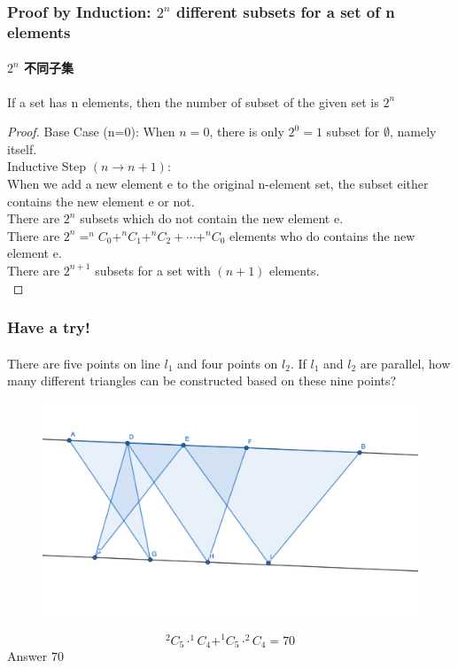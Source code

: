 \documentclass[
	11pt, %
]{beamer}
\begin{document}
\begin{frame}
	\frametitle{Proof by Induction: $2^n$ different subsets for a set of n elements }
	\framesubtitle{$2^n$ 不同子集}
		\begin{theorem}
		If a set has n elements, then the number of subset of the given set is $2^n$
	\end{theorem}

	\begin{proof}
		Base Case (n=0): When $n=0$, there is only $2^0 =1$ subset for $\emptyset$, namely itself.\\
		Inductive Step $(n \rightarrow n + 1)$: \\
		When we add a new element e to the original n-element set, the subset either contains the new element e or not.\\
		There are $2^n$ subsets which do not contain the new element  e.\\
		There are $2^n = ^nC_0+ ^nC_1 + ^nC_2 + \cdots + ^nC_0$ elements who do contains the new element e.\\
		There are $2^{n+1}$ subsets for a set with $(n + 1)$ elements.\\
	\end{proof}
\end{frame}



\begin{frame}
	\frametitle{Have a try!}
	\framesubtitle{}
There are five points on line $l_1$ and four points on $l_2$. If $l_1$ and $l_2$ are parallel, how
many different triangles can be constructed based on these nine points?
  \pause
	\begin{figure}
		\includegraphics[width=0.5\linewidth]{Triangles_Combinations.png}
	\end{figure}

	$$^2C_5 \cdot ^1C_4 + ^1C_5 \cdot^2C_4 = 70$$  
	\bigskip
	\pause
Answer \textbf{$70$} 
\end{frame}
\end{document}
